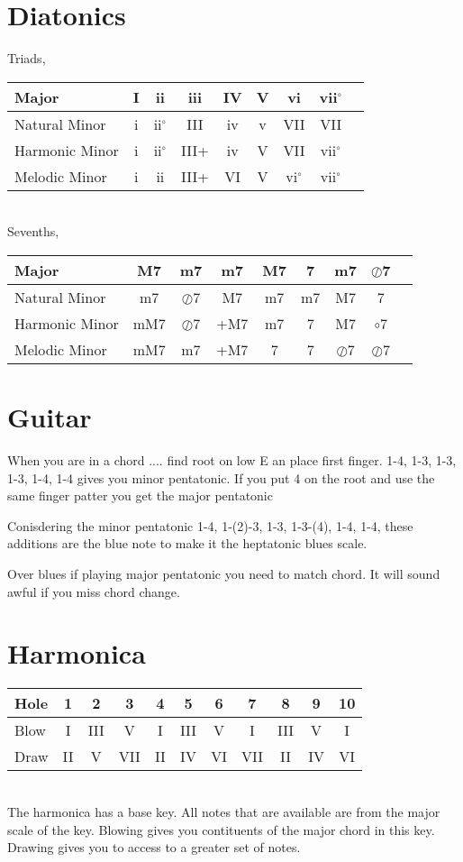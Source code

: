 \documentclass[a4paper]{scrartcl}
\begin{document}
\section{Diatonics}

Triads, \\
\begin{tabular}
{| l | c | c | c | c | c | c | c | c |}
\hline 
Major & I & ii & iii & IV & V & vi & vii$^\circ$  \\ \hline
Natural Minor & i & ii$^\circ$ & III & iv & v & VII & VII   \\ \hline 
Harmonic Minor & i & ii$^\circ$ & III+ & iv & V & VII & vii$^\circ$ \\ \hline
Melodic Minor & i & ii & III+ & VI & V & vi$^\circ$ & vii$^\circ$ \\ \hline
\end{tabular} \\
Sevenths, \\
\begin{tabular}
{| l | c | c | c | c | c | c | c | c |}
\hline 
Major & M7 & m7 & m7 & M7 & 7 & m7 & $\oslash$7  \\ \hline
Natural Minor & m7 & $\oslash$7 & M7 & m7 & m7 & M7 & 7    \\ \hline 
Harmonic Minor & mM7 & $\oslash$7 & +M7 & m7 & 7 & M7 & $\circ$7 \\ \hline
Melodic Minor & mM7 & m7 & +M7 & 7 & 7 & $\oslash$7 & $\oslash$7 \\ \hline
\end{tabular}


\section{Guitar}
When you are in a chord .... find root on low E an place first finger. 1-4, 1-3, 1-3, 1-3, 1-4, 1-4 gives you minor pentatonic. If you put 4 on the root and use the same finger patter you get the major pentatonic

Conisdering the minor pentatonic 1-4, 1-(2)-3, 1-3, 1-3-(4), 1-4, 1-4, these additions are the blue note to make it the heptatonic blues scale. 

Over blues if playing major pentatonic you need to match chord. It will sound awful if you miss chord change.

\section{Harmonica}

\begin{tabular}
{| l | c | c | c | c | c | c | c | c | c | c |}
\hline 
Hole & 1 & 2 & 3 & 4 & 5 & 6 & 7 & 8 & 9 & 10 \\ \hline
Blow & I & III & V & I & III & V & I & III & V & I \\ \hline
Draw & II & V & VII & II & IV & VI & VII & II & IV & VI   \\ \hline 
\end{tabular} \\
The harmonica has a base key. All notes that are available are from the major scale of the key. Blowing gives you contituents of the major chord in this key. Drawing gives you to access to a greater set of notes.
\end{document}
